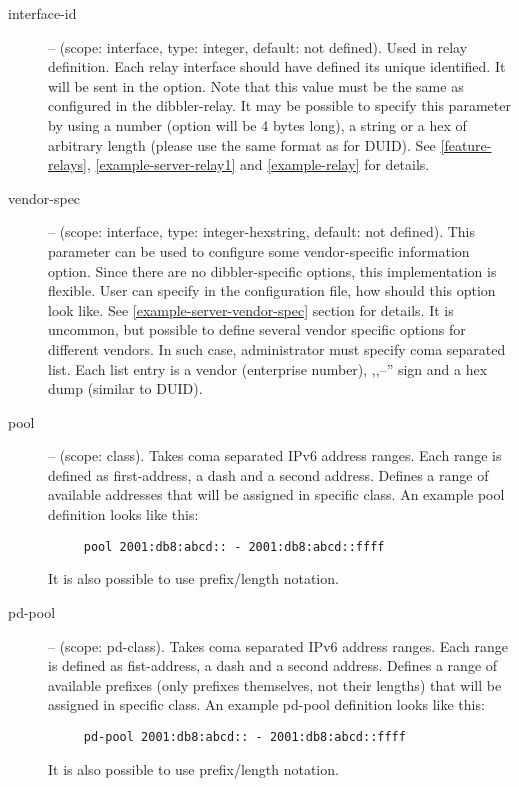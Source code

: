 \begin{description}
\item[interface-id] -- (scope: interface, type: integer, default: not
  defined). Used in relay definition. Each relay interface should have
  defined its unique identified. It will be sent in the
   option. Note that this value must be the same as
  configured in the dibbler-relay. It may be possible to specify this
  parameter by using a number (option will be 4 bytes long), a string
  or a hex of arbitrary length (please use the same format as for
  DUID). See \ref{feature-relays}, \ref{example-server-relay1} and
  \ref{example-relay} for details.

 \item[vendor-spec] -- (scope: interface, type: integer-hexstring,
   default: not defined). This parameter can be used to configure some
   vendor-specific information option. Since there are no
   dibbler-specific options, this implementation is flexible. User can
   specify in the configuration file, how should this option look
   like. See \ref{example-server-vendor-spec} section for details. It
   is uncommon, but possible to define several vendor specific options
   for different vendors. In such case, administrator must specify
   coma separated list. Each list entry is a vendor (enterprise
   number), ,,--'' sign and a hex dump (similar to DUID).

 \item[pool] -- (scope: class). Takes coma separated IPv6 address
   ranges. Each range is defined as first-address, a dash and a second
   address. Defines a range of available addresses that will be
   assigned in specific class. An example pool definition looks like
   this:
   \begin{lstlisting}
     pool 2001:db8:abcd:: - 2001:db8:abcd::ffff
   \end{lstlisting}
   It is also possible to use prefix/length notation.

 \item[pd-pool] -- (scope: pd-class). Takes coma separated IPv6
   address ranges. Each range is defined as fist-address, a dash and a
   second address. Defines a range of available prefixes (only
   prefixes themselves, not their lengths) that will be assigned in
   specific class. An example pd-pool definition looks like this:
   \begin{lstlisting}
     pd-pool 2001:db8:abcd:: - 2001:db8:abcd::ffff
   \end{lstlisting}
   It is also possible to use prefix/length notation.


\end{description}
